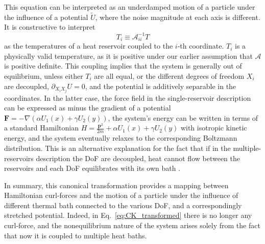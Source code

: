 This equation can be interpreted as an underdamped motion of a particle under the influence of a potential $\tilde{U}$, where the noise magnitude at each axis is different. It is constructive to interpret 
\begin{equation}
    T_i \equiv \mathcal{A}_{ii}^{-1} T
\end{equation} 
as the temperatures of a heat reservoir coupled to the $i$-th coordinate. $T_i$ is a physically valid temperature, as it is positive under our earlier assumption that $\mathcal{A}$ is positive definite. This coupling implies that the system is generally out of equilibrium, unless either $T_i$ are all equal, or the different degrees of freedom $X_i$ are decoupled, $\partial_{X_i X_j} U = 0$, and the potential is additively separable in the coordinates. In the latter case, the force field in the single-reservoir description can be expressed as minus the gradient of a potential $\mathbf{F}=-\nabla(\alpha U_1(x) +\gamma U_2(y))$, the system's energy can be written in terms of a standard Hamiltonian $H=\frac{\mathbf{p}^2}{2m}+\alpha U_1(x) +\gamma U_2(y)$ with isotropic kinetic energy, and the system eventually relaxes to the corresponding Boltzmann distribution. This is an alternative explanation for the fact that if in the multiple-reservoirs description the DoF are decoupled, heat cannot flow between the reservoirs and each DoF equilibrates with its own bath \cite{lin2022stochastic, leighton2024information, netz2020approach}. %

In summary, this canonical transformation provides a mapping between Hamiltonian curl-forces and the motion of a particle under the influence of different thermal bath connected to the various DoF, and a correspondingly stretched potential. Indeed, in Eq.~\ref{eq:CK_transformed} there is no longer any curl-force, and the nonequilibrium nature of the system arises solely from the fact that now it is coupled to multiple heat baths. %

